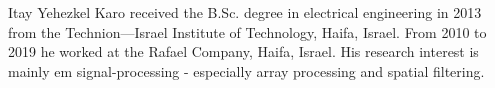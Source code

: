 \begin{IEEEbiography}{Itay Yehezkel Karo}
received the B.Sc. degree in electrical engineering in 2013 from the Technion—Israel Institute of Technology, Haifa, Israel.
From 2010 to 2019 he worked at the Rafael Company, Haifa, Israel.
His research interest is mainly em signal-processing - especially array processing and spatial filtering.
\end{IEEEbiography}